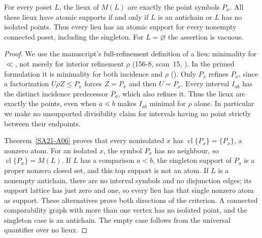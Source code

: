 \begin{corollary}
\label{SA21-A14a}
For every poset $L$, the lieux of $M(L)$ are exactly the point symbols
$P_x$. All these lieux have atomic supports if and only if $L$ is an
antichain or $L$ has no isolated points. Thus every lieu has an atomic
support for every nonempty connected poset, including the singleton.
For $L=\varnothing$ the assertion is vacuous.
\end{corollary}
\begin{proof}
We use the manuscript's full-refinement definition of a lieu:
minimality for $\ll$, not merely for interior refinement $\rho$
(156-8, scan~15, ).
In the primed formulation it is minimality for both incidence and
$\rho$ ().
Only $P_x$ refines $P_x$, since a factorization
$U\rho Z\le P_x$ forces $Z=P_x$ and then $U=P_x$.
Every interval $I_{ab}$ has the distinct incidence predecessor
$P_a$, which also refines it. Thus the lieux are exactly the points,
even when $a\lessdot b$ makes $I_{ab}$ minimal for $\rho$ alone.
In particular we make no unsupported divisibility claim for intervals
having no point strictly between their endpoints.

Theorem~\ref{SA21-A06} proves that every nonisolated $x$ has
$\operatorname{cl}\{P_x\}=\{P_x\}$, a nonzero atom.
For an isolated $x$, the symbol $P_x$ has no neighbour, so
$\operatorname{cl}\{P_x\}=M(L)$. If $L$ has a comparison $a<b$,
the singleton support of $P_a$ is a proper nonzero closed set,
and this top support is not an atom. If $L$ is a nonempty antichain,
there are no interval symbols and no disjunction edges; its support
lattice has just zero and one, so every lieu has that single nonzero
atom as support. These alternatives prove both directions of the
criterion. A connected comparability graph with more than one vertex
has no isolated point, and the singleton case is an antichain.
The empty case follows from the universal quantifier over no lieux.
\end{proof}
